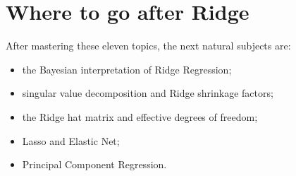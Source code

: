 \documentclass[11pt,a4paper,oneside]{book}
\theoremstyle{remark}
\begin{document}
\backmatter
\chapter*{Where to go after Ridge}
After mastering these eleven topics, the next natural subjects are:
\begin{itemize}
\item the Bayesian interpretation of Ridge Regression;
\item singular value decomposition and Ridge shrinkage factors;
\item the Ridge hat matrix and effective degrees of freedom;
\item Lasso and Elastic Net;
\item Principal Component Regression.
\end{itemize}
\end{document}
